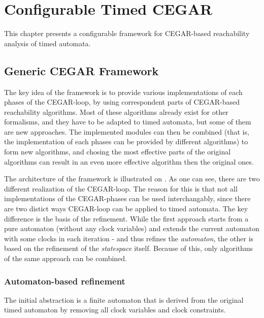 \chapter{Configurable Timed CEGAR} \label{chap:timed_cegar}

This chapter presents a configurable framework for CEGAR-based reachability analysis of timed automata. 

\section{Generic CEGAR Framework}

The key idea of the framework is to provide various implementations of each phases of the CEGAR-loop, by using correspondent parts of CEGAR-based reachability algorithms. Most of these algorithms already exist for other formalisms, and they have to be adapted to timed automata, but some of them are new approaches. The implemented modules can then be combined (that is, the implementation of each phases can be provided by different algorithms) to form new algorithms, and chosing the most effective parts of the original algorithms can result in an even more effective algorithm then the original ones. 

The architecture of the framework is illustrated on . As one can see, there are two different realization of the CEGAR-loop. The reason for this is that not all implementations of the CEGAR-phases can be used interchangably, since there are two distict ways CEGAR-loop can be applied to timed automata. The key difference is the basis of the refinement. While the first approach  starts from a pure automaton (without any clock variables) and extends the current automaton with some clocks in each iteration  - and thus refines the \emph{automaton}, the other  is based on the refinement of the \emph{statespace} itself. Because of this, only algorithms of the same approach can be combined.

\subsection{Automaton-based refinement}

 The initial abstraction is a finite automaton that is derived from the original timed automaton by removing all clock variables and clock constraints. 

